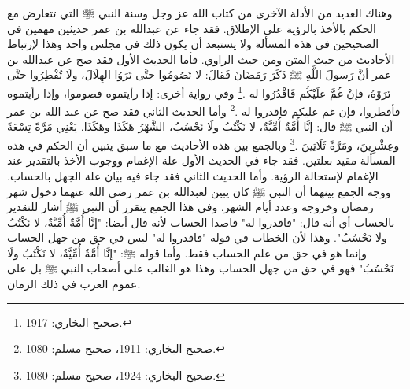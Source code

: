 وهناك العديد من الأدلة الآخرى من كتاب الله عز وجل وسنة النبي ﷺ التي تتعارض مع الحكم بالأخذ بالرؤية على الإطلاق. فقد جاء عن عبدالله بن عمر حديثين مهمين في الصحيحين في هذه المسألة ولا يستبعد أن يكون ذلك في مجلس واحد وهذا لإرتباط الأحاديث من حيث المتن ومن حيث الراوي. فأما الحديث الأول فقد صح عن عبدالله بن عمر أنَّ رَسولَ اللَّهِ ﷺ ذَكَرَ رَمَضَانَ فَقالَ: لا تَصُومُوا حتَّى تَرَوُا الهِلَالَ، ولَا تُفْطِرُوا حتَّى تَرَوْهُ، فإنْ غُمَّ علَيْكُم فَاقْدُرُوا له \href{https://shamela.ws/book/1284/1256#p6}{\faExternalLink} \cite{bukhari}.\footnote{صحيح البخاري: 1917.} وفي رواية أخرى: إذا رأيتموه فصوموا، وإذا رأيتموه فأفطروا، فإن غم عليكم فاقدروا له \href{https://shamela.ws/book/1284/1254#p1}{\faExternalLink} \cite{bukhari} \href{https://shamela.ws/book/1727/2430#p3}{\faExternalLink} \cite{muslim}.\footnote{صحيح البخاري: 1911، صحيح مسلم: 1080.} وأما الحديث الثاني فقد صح عن عبد الله بن عمر أن النبي ﷺ قال: إنَّا أُمَّةٌ أُمِّيَّةٌ، لا نَكْتُبُ ولَا نَحْسُبُ، الشَّهْرُ هَكَذَا وهَكَذَا. يَعْنِي مَرَّةً تِسْعَةً وعِشْرِينَ، ومَرَّةً ثَلَاثِينَ \href{https://shamela.ws/book/1284/1259#p3}{\faExternalLink} \cite{bukhari} \href{https://shamela.ws/book/1727/2443#p2}{\faExternalLink} \cite{muslim}.\footnote{صحيح البخاري: 1924، صحيح مسلم: 1080.} وبالجمع بين هذه الأحاديث مع ما سبق يتبين أن الحكم في هذه المسألة مقيد بعلتين.  فقد جاء في الحديث الأول علة الإغمام ووجوب الأخذ بالتقدير عند الإغمام لإستحالة الرؤية. وأما الحديث الثاني فقد جاء فيه بيان علة الجهل بالحساب. ووجه الجمع بينهما أن النبي ﷺ كان يبين لعبدالله بن عمر رضي الله عنهما دخول شهر رمضان وخروجه وعدد أيام الشهر. وفي هذا الجمع يتقرر أن النبي ﷺ أشار للتقدير بالحساب أي أنه قال: "فاقدروا له" قاصدا الحساب لأنه قال أيضا: "إنَّا أُمَّةٌ أُمِّيَّةٌ، لا نَكْتُبُ ولَا نَحْسُبُ". وهذا لأن الخطاب في قوله "فاقدروا له" ليس في حق من جهل الحساب وإنما هو في حق من علم الحساب فقط. وأما قوله ﷺ: "إنَّا أُمَّةٌ أُمِّيَّةٌ، لا نَكْتُبُ ولَا نَحْسُبُ" فهو في حق من جهل الحساب وهذا هو الغالب على أصحاب النبي ﷺ بل على عموم العرب في ذلك الزمان.

